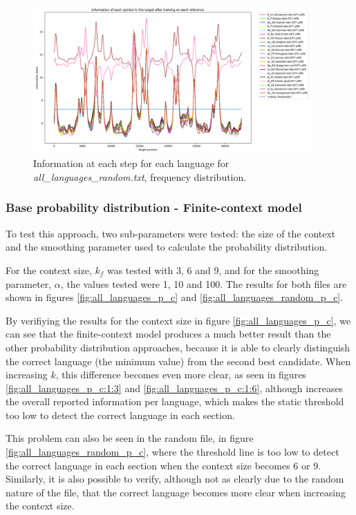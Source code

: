\documentclass{article}
\begin{document}
\begin{figure}
    \centering
    \includegraphics[width=0.95\textwidth]{../results/all_languages_random/-p_f.png}
    \caption{Information at each step for each language for \textit{all\_languages\_random.txt}, frequency distribution.}
    \label{fig:all_languages_random_p_f}
\end{figure}

\subsubsection{Base probability distribution - Finite-context model}
\label{subsubsec:results_locate_lang_first_order_fcm}

To test this approach, two sub-parameters were tested: the size of the context and the smoothing parameter used to calculate the probability distribution.

For the context size, $k_f$ was tested with 3, 6 and 9, and for the smoothing parameter, $\alpha$, the values tested were 1, 10 and 100.
The results for both files are shown in figures \ref{fig:all_languages_p_c} and \ref{fig:all_languages_random_p_c}.

By verifiying the results for the context size in figure \ref{fig:all_languages_p_c}, we can see that the finite-context model produces a much better result than the other probability distribution approaches,
because it is able to clearly distinguish the correct language (the minimum value) from the second best candidate.
When increasing $k$, this difference becomes even more clear, as seen in figures \ref{fig:all_languages_p_c:1:3} and \ref{fig:all_languages_p_c:1:6},
although increases the overall reported information per language, which makes the static threshold too low to detect the correct language in each section.

This problem can also be seen in the random file, in figure \ref{fig:all_languages_random_p_c}, where the threshold line is too low to detect the correct language in each section when the context size
becomes $6$ or $9$.
Similarly, it is also possible to verify, although not as clearly due to the random nature of the file, that the correct language becomes more clear when increasing the context size.
\end{document}
